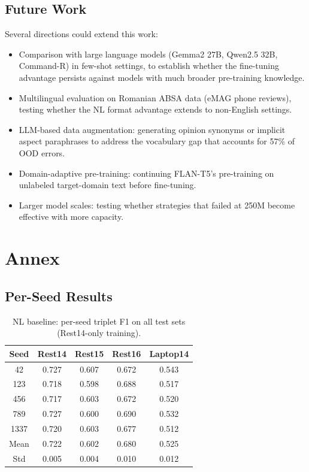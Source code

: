 \documentclass[12pt,a4paper]{report}
\begin{document}
\section{Future Work}

Several directions could extend this work:

\begin{itemize}
    \item Comparison with large language models (Gemma2 27B, Qwen2.5 32B, Command-R) in few-shot settings, to establish whether the fine-tuning advantage persists against models with much broader pre-training knowledge.
    \item Multilingual evaluation on Romanian ABSA data (eMAG phone reviews), testing whether the NL format advantage extends to non-English settings.
    \item LLM-based data augmentation: generating opinion synonyms or implicit aspect paraphrases to address the vocabulary gap that accounts for 57\% of OOD errors.
    \item Domain-adaptive pre-training: continuing FLAN-T5's pre-training on unlabeled target-domain text before fine-tuning.
    \item Larger model scales: testing whether strategies that failed at 250M become effective with more capacity.
\end{itemize}


\chapter{Annex}\label{ch:annex}

\section{Per-Seed Results}

\begin{table}[H]
\centering
\caption{NL baseline: per-seed triplet F1 on all test sets (Rest14-only training).}
\small
\begin{tabular}{@{}ccccc@{}}
\toprule
\textbf{Seed} & \textbf{Rest14} & \textbf{Rest15} & \textbf{Rest16} & \textbf{Laptop14} \\
\midrule
42 & 0.727 & 0.607 & 0.672 & 0.543 \\
123 & 0.718 & 0.598 & 0.688 & 0.517 \\
456 & 0.717 & 0.603 & 0.672 & 0.520 \\
789 & 0.727 & 0.600 & 0.690 & 0.532 \\
1337 & 0.720 & 0.603 & 0.677 & 0.512 \\
\midrule
Mean & 0.722 & 0.602 & 0.680 & 0.525 \\
Std & 0.005 & 0.004 & 0.010 & 0.012 \\
\bottomrule
\end{tabular}
\end{table}
\end{document}
